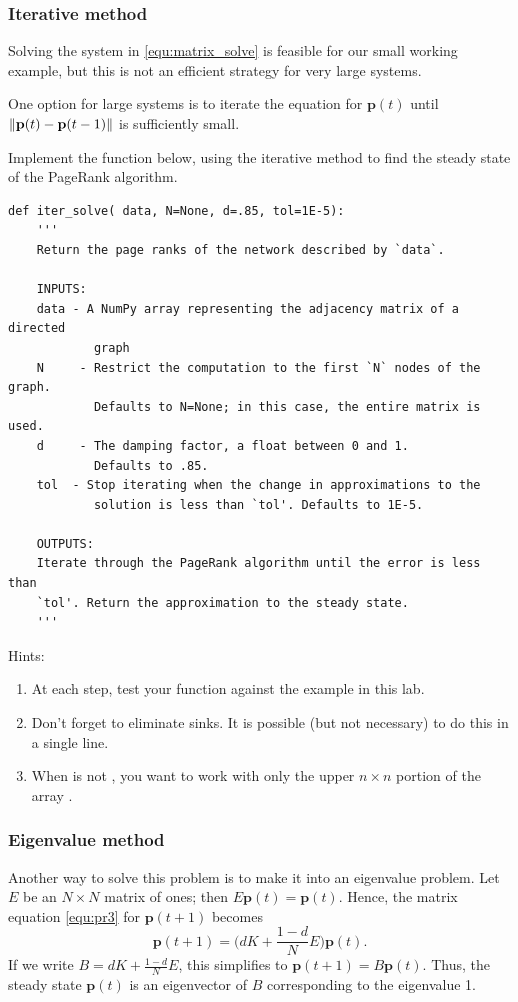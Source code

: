 \subsubsection*{Iterative method}
Solving the system in \eqref{equ:matrix_solve} is feasible for our small working example, but this is not an efficient strategy for very large systems.

One option for large systems is to iterate the equation for $\mathbf{p}(t)$ until $\left\lVert\mathbf{p}(t)-\mathbf{p}(t-1)\right\rVert$ is sufficiently small.


\begin{problem}
\label{prob:pagerank_dense_iter}
Implement the function below, using the iterative method to find the steady state of the PageRank algorithm.
\begin{lstlisting}
def iter_solve( data, N=None, d=.85, tol=1E-5):
    '''
    Return the page ranks of the network described by `data`.
    
    INPUTS:
    data - A NumPy array representing the adjacency matrix of a directed 
            graph
    N     - Restrict the computation to the first `N` nodes of the graph. 
            Defaults to N=None; in this case, the entire matrix is used.
    d     - The damping factor, a float between 0 and 1. 
            Defaults to .85.
    tol  - Stop iterating when the change in approximations to the 
            solution is less than `tol'. Defaults to 1E-5.
    
    OUTPUTS:
    Iterate through the PageRank algorithm until the error is less than 
    `tol'. Return the approximation to the steady state.
    '''
\end{lstlisting}
Hints:
\begin{enumerate}
\item At each step, test your function against the example in this lab.
\item Don't forget to eliminate sinks. 
It is possible (but not necessary) to do this in a single line.
\item When  is not , you want to work with only the upper $n \times n$ portion of the array .
\end{enumerate}
\end{problem}

\subsubsection*{Eigenvalue method}
Another way to solve this problem is to make it into an eigenvalue problem. 
Let $E$ be an $N \times N$ matrix of ones; then $E\mathbf{p}(t) = \mathbf{p}(t)$. 
Hence, the matrix equation \eqref{equ:pr3} for $\mathbf{p}(t+1)$ becomes
\[\mathbf{p}(t+1) = \Big(dK + \frac{1-d}{N}E\Big)\mathbf{p}(t).\]
If we write $B = dK + \frac{1-d}{N}E$, this simplifies to $\mathbf{p}(t+1) = B\mathbf{p}(t).$
Thus, the steady state $\mathbf{p}(t)$ is an eigenvector of $B$ corresponding to the eigenvalue 1.


